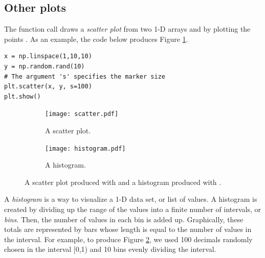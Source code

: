 \subsection*{Other plots}
The function call  draws a \emph{scatter plot} from two 1-D arrays  and  by plotting the points .
As an example, the code below produces Figure \ref{fig:scatter}.

\begin{lstlisting}
x = np.linspace(1,10,10)
y = np.random.rand(10)
# The argument 's' specifies the marker size
plt.scatter(x, y, s=100)
plt.show()
\end{lstlisting}


\begin{figure}
\centering
\begin{subfigure}[t]{.49\textwidth}
\centering
\texttt{[image: scatter.pdf]}
\caption{A scatter plot.}
\label{fig:scatter}
\end{subfigure}
\begin{subfigure}[t]{.49\textwidth}
\centering
\texttt{[image: histogram.pdf]}
\caption{A histogram.}
\label{fig:histogram}
\end{subfigure}
\caption{A scatter plot produced with  and a histogram produced with .}
\label{fig:otherplots}
\end{figure}


A \emph{histogram} is a way to visualize a 1-D data set, or list of values. 
A histogram is created by dividing up the range of the values into a finite number of intervals, or \emph{bins}.
Then, the number of values in each bin is added up.
Graphically, these totals are represented by bars whose length is equal to the number of values in the interval.
For example, to produce Figure \ref{fig:histogram}, we used 100 decimals randomly chosen in the interval [0,1) and 10 bins evenly dividing the interval.

